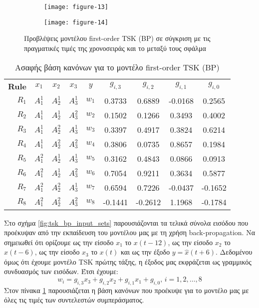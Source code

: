 \documentclass[11pt,a4paper,titlepage, oneside]{article}
\newlength\figureheight
\newlength\figurewidth
\begin{document}
			\begin{figure}[h]
			 	\setlength{}
				\setlength{}	
				\centering
				\begin{subfigure}[b]{0.49\textwidth}
					\texttt{[image: figure-13]}
				\end{subfigure}
				\begin{subfigure}[b]{0.49\textwidth}
					\texttt{[image: figure-14]}
				\end{subfigure}
				\caption{Προβλέψεις μοντέλου first-order TSK (BP) σε σύγκριση με τις πραγματικές τιμές της χρονοσειράς και το μεταξύ τους σφάλμα}
				\label{fig:tsk_bp_predictions}
			\end{figure}
			
			\begin{table}[h]
				\centering
				\begin{tabular}[b]{r c c c||c|c|c|c|c}
					 \bfseries{Rule} & $x_1$ & $x_2$ & $x_3$ & $y$ & $g_{i, 3}$ & $g_{i, 2}$ & $g_{i, 1}$ & $g_{i, 0}$\\ \hhline{====||=|====}
						$R_{1}$ & $A_1^1$ & $A_2^1$ & $A_3^1$ & $w_1$ & 0.3733 & 0.6889 & -0.0168 & 0.2565 \\%
						$R_{2}$ & $A_1^1$ & $A_2^1$ & $A_3^2$ & $w_2$ & 0.1502 & 0.1266 & 0.3493 & 0.4002 \\%
						$R_{3}$ & $A_1^1$ & $A_2^2$ & $A_3^1$ & $w_3$ & 0.3397 & 0.4917 & 0.3824 & 0.6214 \\%
						$R_{4}$ & $A_1^1$ & $A_2^2$ & $A_3^2$ & $w_4$ & 0.3806 & 0.0735 & 0.8657 & 0.1984 \\%
						$R_{5}$ & $A_1^2$ & $A_2^1$ & $A_3^1$ & $w_5$ & 0.3162 & 0.4843 & 0.0866 & 0.0913 \\%
						$R_{6}$ & $A_1^2$ & $A_2^1$ & $A_3^2$ & $w_6$ & 0.7054 & 0.9211 & 0.3634 & 0.5877 \\%
						$R_{7}$ & $A_1^2$ & $A_2^2$ & $A_3^1$ & $w_7$ & 0.6594 & 0.7226 & -0.0437 & -0.1652 \\%
						$R_{8}$ & $A_1^2$ & $A_2^2$ & $A_3^2$ & $w_8$ & -0.1441 & -0.2612 & 1.1968 & -0.1784 \\%
				\end{tabular}
				\caption{Ασαφής βάση κανόνων για το μοντέλο first-order TSK (BP)}
				\label{tab:tsk_bp_rulebase}
			\end{table}

			Στο σχήμα \ref{fig:tsk_bp_input_sets} παρουσιάζονται τα τελικά σύνολα εισόδου που προέκυψαν από την εκπαίδευση του μοντέλου μας με τη χρήση back-propagation. Να σημειωθεί ότι ορίζουμε ως την είσοδο $x_1$ το $x(t-12)$, ως την είσοδο $x_2$ το $x(t-6)$, ως την είσοδο $x_3$ το $x(t)$ και ως την έξοδο $y = \hat{x}(t+6)$. Δεδομένου όμως ότι έχουμε μοντέλο TSK πρώτης τάξης, η έξοδος μας εκφράζεται ως γραμμικός συνδυασμός των εισόδων. Έτσι έχουμε:
			$$ w_i = g_{i,3}x_3 + g_{i,2}x_2 + g_{i, 1}x_1 + g_{i,0},\, i = 1,2,\ldots,8 $$
			Στον πίνακα \ref{tab:tsk_bp_rulebase} παρουσιάζεται η βάση κανόνων που προέκυψε για το μοντέλο μας με όλες τις τιμές των συντελεστών συμπεράσματος.
			
\end{document}
